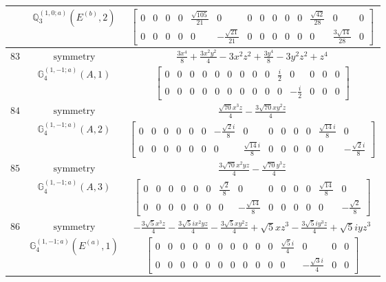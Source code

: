 \documentclass[fleqn,8pt,landscape]{jsarticle}
\begin{document}
\begin{longtable}{ccc}
$  $ & $ \mathbb{Q}_{3}^{(1,0;a)}(E^{(b)},2) $ & $ \begin{bmatrix} 0 & 0 & 0 & 0 & \frac{\sqrt{105}}{21} & 0 & 0 & 0 & 0 & 0 & 0 & \frac{\sqrt{42}}{28} & 0 & 0 \\ 0 & 0 & 0 & 0 & 0 & - \frac{\sqrt{21}}{21} & 0 & 0 & 0 & 0 & 0 & 0 & \frac{3 \sqrt{14}}{28} & 0 \end{bmatrix} $ \\ \hline
$ 83 $ & $ \text{symmetry} $ & $ \frac{3 x^{4}}{8} + \frac{3 x^{2} y^{2}}{4} - 3 x^{2} z^{2} + \frac{3 y^{4}}{8} - 3 y^{2} z^{2} + z^{4} $ \\
$  $ & $ \mathbb{G}_{4}^{(1,-1;a)}(A,1) $ & $ \begin{bmatrix} 0 & 0 & 0 & 0 & 0 & 0 & 0 & 0 & 0 & \frac{i}{2} & 0 & 0 & 0 & 0 \\ 0 & 0 & 0 & 0 & 0 & 0 & 0 & 0 & 0 & 0 & - \frac{i}{2} & 0 & 0 & 0 \end{bmatrix} $ \\ \hline
$ 84 $ & $ \text{symmetry} $ & $ \frac{\sqrt{70} x^{3} z}{4} - \frac{3 \sqrt{70} x y^{2} z}{4} $ \\
$  $ & $ \mathbb{G}_{4}^{(1,-1;a)}(A,2) $ & $ \begin{bmatrix} 0 & 0 & 0 & 0 & 0 & 0 & - \frac{\sqrt{2} i}{8} & 0 & 0 & 0 & 0 & 0 & \frac{\sqrt{14} i}{8} & 0 \\ 0 & 0 & 0 & 0 & 0 & 0 & 0 & \frac{\sqrt{14} i}{8} & 0 & 0 & 0 & 0 & 0 & - \frac{\sqrt{2} i}{8} \end{bmatrix} $ \\ \hline
$ 85 $ & $ \text{symmetry} $ & $ \frac{3 \sqrt{70} x^{2} y z}{4} - \frac{\sqrt{70} y^{3} z}{4} $ \\
$  $ & $ \mathbb{G}_{4}^{(1,-1;a)}(A,3) $ & $ \begin{bmatrix} 0 & 0 & 0 & 0 & 0 & 0 & \frac{\sqrt{2}}{8} & 0 & 0 & 0 & 0 & 0 & \frac{\sqrt{14}}{8} & 0 \\ 0 & 0 & 0 & 0 & 0 & 0 & 0 & - \frac{\sqrt{14}}{8} & 0 & 0 & 0 & 0 & 0 & - \frac{\sqrt{2}}{8} \end{bmatrix} $ \\ \hline
$ 86 $ & $ \text{symmetry} $ & $ - \frac{3 \sqrt{5} x^{3} z}{4} - \frac{3 \sqrt{5} i x^{2} y z}{4} - \frac{3 \sqrt{5} x y^{2} z}{4} + \sqrt{5} x z^{3} - \frac{3 \sqrt{5} i y^{3} z}{4} + \sqrt{5} i y z^{3} $ \\
$  $ & $ \mathbb{G}_{4}^{(1,-1;a)}(E^{(a)},1) $ & $ \begin{bmatrix} 0 & 0 & 0 & 0 & 0 & 0 & 0 & 0 & 0 & 0 & \frac{\sqrt{5} i}{4} & 0 & 0 & 0 \\ 0 & 0 & 0 & 0 & 0 & 0 & 0 & 0 & 0 & 0 & 0 & - \frac{\sqrt{3} i}{4} & 0 & 0 \end{bmatrix} $ \\ \hline

\end{longtable}
\end{document}
